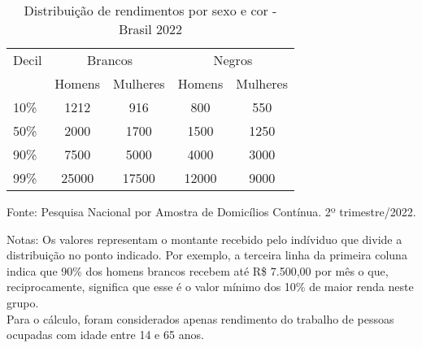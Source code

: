 \begin{table}[htb!]
    \centering
    \caption{Distribuição de rendimentos por sexo e cor - Brasil 2022}
    \begin{tabular}{lcccc}
    \hline
    Decil & \multicolumn{2}{c}{Brancos} & \multicolumn{2}{c}{Negros} \\ \cline{2-5} 
          & Homens      & Mulheres      & Homens      & Mulheres     \\ \hline
    10\%  & 1212        & 916           & 800         & 550          \\
    50\%  & 2000        & 1700          & 1500        & 1250         \\
    90\%  & 7500        & 5000          & 4000        & 3000         \\
    99\%  & 25000       & 17500         & 12000       & 9000         \\ \hline
    \end{tabular}
    \label{tab:decis}
    \begin{floatnotes}
      \item[Fonte:] Pesquisa Nacional por Amostra de Domicílios Contínua. 2º trimestre/2022.
      \item[Notas:] Os valores representam o montante recebido pelo indíviduo que divide a distribuição no ponto indicado. Por exemplo, a terceira linha da primeira coluna indica que 90\% dos homens brancos recebem até R\$ 7.500,00 por mês o que, reciprocamente, significa que esse é o valor mínimo dos 10\% de maior renda neste grupo. \\
      Para o cálculo, foram considerados apenas rendimento do trabalho de pessoas ocupadas com idade entre 14 e 65 anos.
  \end{floatnotes}
    \end{table}
